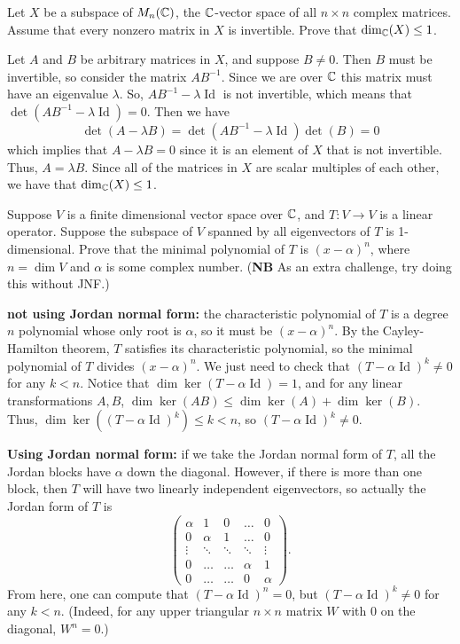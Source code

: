 %
\begin{question}[subtitle=January 1994 Problem 4, ID=Jan94_4]
Let $X$ be a subspace of $M_n(\mathbb{C})$, the $\mathbb{C}$-vector space of all $n\times n$ complex matrices. Assume that every nonzero matrix in $X$ is invertible. Prove that $\dim_{\mathbb{C}}(X) \leq 1$.
\end{question}
\begin{solution}
Let $A$ and $B$ be arbitrary matrices in $X$, and suppose $B \neq 0$. Then $B$ must be invertible, so consider the matrix $AB^{-1}$. Since we are over $\mathbb{C}$ this matrix must have an eigenvalue $\lambda$. So, $AB^{-1}-\lambda \operatorname{Id}$ is not invertible, which means that $\det(AB^{-1}-\lambda\operatorname{Id})=0$. Then we have
\[\det(A-\lambda B) = \det(AB^{-1}-\lambda\operatorname{Id})\det(B)=0\]
which implies that $A-\lambda B=0$ since it is an element of $X$ that is not invertible. Thus, $A=\lambda B$. Since all of the matrices in $X$ are scalar multiples of each other, we have that $\dim_{\mathbb{C}}(X) \leq 1$.
\end{solution}

\begin{question}[subtitle=January 1983 Problem 1,ID=Jan83_1]
Suppose $V$ is a finite dimensional vector space over $\mathbb{C}$, and $T\colon V \to V$ is a linear operator. Suppose the subspace of $V$ spanned by all eigenvectors of $T$ is 1-dimensional. Prove that the minimal polynomial of $T$ is $(x-\alpha)^n$, where $n = \dim V$ and $\alpha$ is some complex number. (\textbf{NB} As an extra challenge, try doing this without JNF.)
\end{question}
\begin{solution}
\textbf{not using Jordan normal form:} the characteristic polynomial of $T$ is a degree $n$ polynomial whose only root is $\alpha$, so it must be $(x-\alpha)^n$. By the Cayley-Hamilton theorem, $T$ satisfies its characteristic polynomial, so the minimal polynomial of $T$ divides $(x-\alpha)^n$. We just need to check that $(T-\alpha\operatorname{Id})^k \neq 0$ for any $k < n$. Notice that $\dim \ker(T-\alpha\operatorname{Id}) = 1$, and for any linear transformations $A, B$, $\dim \ker(AB) \leq \dim \ker(A) + \dim \ker(B)$. Thus, $\dim \ker((T-\alpha\operatorname{Id})^k) \leq k < n$, so $(T-\alpha\operatorname{Id})^k \neq 0$.

\textbf{Using Jordan normal form:} if we take the Jordan normal form of $T$, all the Jordan blocks have $\alpha$ down the diagonal. However, if there is more than one block, then $T$ will have two linearly independent eigenvectors, so actually the Jordan form of $T$ is
\[\begin{pmatrix}
\alpha & 1 & 0 & \dots & 0\\
0 & \alpha & 1 & \dots & 0\\
\vdots & \ddots & \ddots & \ddots & \vdots\\
0 & \dots & \dots & \alpha & 1\\
0 & \dots & \dots & 0 & \alpha
\end{pmatrix}.\]
From here, one can compute that $(T-\alpha\operatorname{Id})^n = 0$, but $(T - \alpha\operatorname{Id})^k \neq 0$ for any $k < n$. (Indeed, for any upper triangular $n \times n$ matrix $W$ with $0$ on the diagonal, $W^n=0$.)
\end{solution}